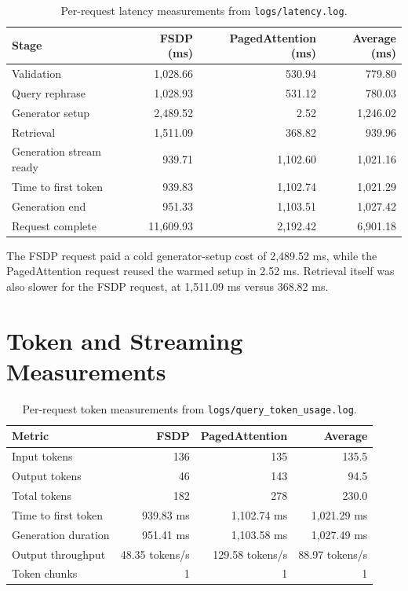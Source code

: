 \documentclass[11pt,a4paper]{article}
\begin{document}
\begin{table}[ht]
\centering
\caption{Per-request latency measurements from \texttt{logs/latency.log}.}
\begin{tabular}{lrrr}
\toprule
\textbf{Stage} & \textbf{FSDP (ms)} & \textbf{PagedAttention (ms)} & \textbf{Average (ms)} \\
\midrule
Validation & 1,028.66 & 530.94 & 779.80 \\
Query rephrase & 1,028.93 & 531.12 & 780.03 \\
Generator setup & 2,489.52 & 2.52 & 1,246.02 \\
Retrieval & 1,511.09 & 368.82 & 939.96 \\
Generation stream ready & 939.71 & 1,102.60 & 1,021.16 \\
Time to first token & 939.83 & 1,102.74 & 1,021.29 \\
Generation end & 951.33 & 1,103.51 & 1,027.42 \\
Request complete & 11,609.93 & 2,192.42 & 6,901.18 \\
\bottomrule
\end{tabular}
\end{table}

The FSDP request paid a cold generator-setup cost of 2,489.52 ms, while the PagedAttention request reused the warmed setup in 2.52 ms. Retrieval itself was also slower for the FSDP request, at 1,511.09 ms versus 368.82 ms.

\section{Token and Streaming Measurements}

\begin{table}[ht]
\centering
\caption{Per-request token measurements from \texttt{logs/query\_token\_usage.log}.}
\begin{tabular}{lrrr}
\toprule
\textbf{Metric} & \textbf{FSDP} & \textbf{PagedAttention} & \textbf{Average} \\
\midrule
Input tokens & 136 & 135 & 135.5 \\
Output tokens & 46 & 143 & 94.5 \\
Total tokens & 182 & 278 & 230.0 \\
Time to first token & 939.83 ms & 1,102.74 ms & 1,021.29 ms \\
Generation duration & 951.41 ms & 1,103.58 ms & 1,027.49 ms \\
Output throughput & 48.35 tokens/s & 129.58 tokens/s & 88.97 tokens/s \\
Token chunks & 1 & 1 & 1 \\
\bottomrule
\end{tabular}
\end{table}
\end{document}
